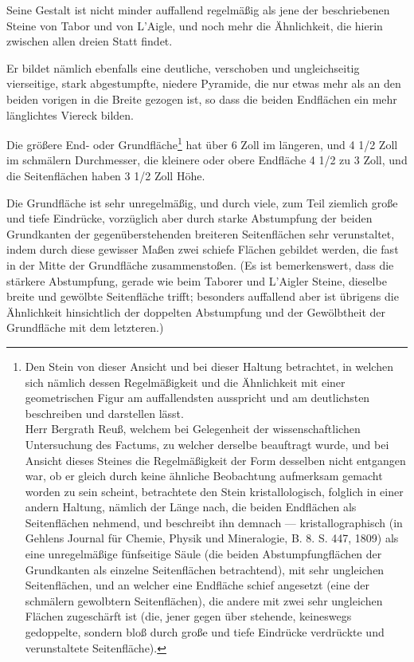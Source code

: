 \documentclass[a4paper, 11pt, oneside, german]{article}
\begin{document}
Seine Gestalt ist nicht minder auffallend regelmäßig als jene der beschriebenen Steine von Tabor und von L'Aigle, und noch mehr die Ähnlichkeit, die hierin zwischen allen dreien Statt findet.

Er bildet nämlich ebenfalls eine deutliche, verschoben und ungleichseitig vierseitige, stark abgestumpfte, niedere Pyramide, die nur etwas mehr als an den beiden vorigen in die Breite gezogen ist, so dass die beiden Endflächen ein mehr länglichtes Viereck bilden.

Die größere End- oder Grundfläche\footnote{Den Stein von dieser Ansicht und bei dieser Haltung betrachtet, in welchen sich nämlich dessen Regelmäßigkeit und die Ähnlichkeit mit einer geometrischen Figur am auffallendsten ausspricht und am deutlichsten beschreiben und darstellen lässt.\\
Herr Bergrath Reuß, welchem bei Gelegenheit der wissenschaftlichen Untersuchung des Factums, zu welcher derselbe beauftragt wurde, und bei Ansicht dieses Steines die Regelmäßigkeit der Form desselben nicht entgangen war, ob er gleich durch keine ähnliche Beobachtung aufmerksam gemacht worden zu sein scheint, betrachtete den Stein kristallologisch, folglich in einer andern Haltung, nämlich der Länge nach, die beiden Endflächen als Seitenflächen nehmend, und beschreibt ihn demnach --- kristallographisch (in Gehlens Journal für Chemie, Physik und Mineralogie, B. 8. S. 447, 1809) als eine unregelmäßige fünfseitige Säule (die beiden Abstumpfungflächen der Grundkanten als einzelne Seitenflächen betrachtend), mit sehr ungleichen Seitenflächen, und an welcher eine Endfläche schief angesetzt (eine der schmälern gewolbtern Seitenflächen), die andere mit zwei sehr ungleichen Flächen zugeschärft ist (die, jener gegen über stehende, keineswegs gedoppelte, sondern bloß durch große und tiefe Eindrücke verdrückte und verunstaltete Seitenfläche).} hat über 6 Zoll im längeren, und 4 1/2 Zoll im schmälern Durchmesser, die kleinere oder obere Endfläche 4 1/2 zu 3 Zoll, und die Seitenflächen haben 3 1/2 Zoll Höhe.

Die Grundfläche ist sehr unregelmäßig, und durch viele, zum Teil ziemlich große und tiefe Eindrücke, vorzüglich aber durch starke Abstumpfung der beiden Grundkanten der gegenüberstehenden breiteren Seitenflächen sehr verunstaltet, indem durch diese gewisser Maßen zwei schiefe Flächen gebildet werden, die fast in der Mitte der Grundfläche zusammenstoßen. (Es ist bemerkenswert, dass die stärkere Abstumpfung, gerade wie beim Taborer und L'Aigler Steine, dieselbe breite und gewölbte Seitenfläche trifft; besonders auffallend aber ist übrigens die Ähnlichkeit hinsichtlich der doppelten Abstumpfung und der Gewölbtheit der Grundfläche mit dem letzteren.)
\end{document}
